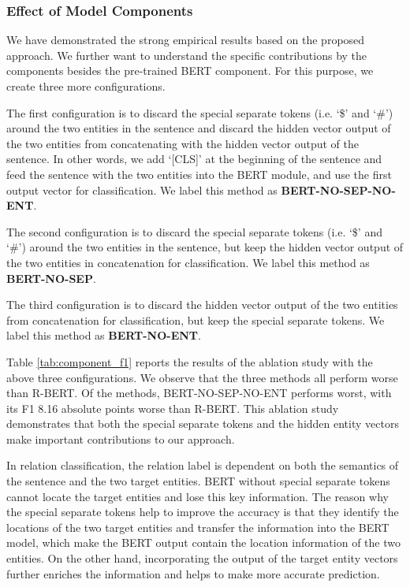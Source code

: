 \documentclass[11pt]{article}
\begin{document}
\subsubsection{Effect of Model Components}

We have demonstrated the strong empirical results
based on the proposed approach. We further want to
understand the specific contributions by the components besides the 
pre-trained BERT component. For this purpose, we create
three more configurations.  

The first configuration is to discard the special separate tokens (i.e. `\$' and `\#') around
the two entities in the sentence and discard the hidden vector output
of the two entities from concatenating with the hidden vector output 
of the sentence. In other words, we add `[CLS]' at the beginning of the sentence and feed the sentence with the two entities into
the BERT module, and use
the first output vector for classification. We label this method as
\textbf{BERT-NO-SEP-NO-ENT}.


The second configuration is to discard the special separate tokens (i.e. `\$' and `\#') around
the two entities in the sentence, but keep the hidden vector output
of the two entities in concatenation for classification. We label this method as
\textbf{BERT-NO-SEP}.

The third configuration is to discard the hidden vector output
of the two entities from concatenation for classification, but keep the special separate tokens. We label this method as
\textbf{BERT-NO-ENT}.

Table \ref{tab:component_f1} reports the results of the ablation study
with the above three configurations. We observe that the three
methods all perform worse than R-BERT. Of the methods,  BERT-NO-SEP-NO-ENT performs worst, with its F1 8.16 absolute points worse
than R-BERT. This ablation study demonstrates that both the special separate
tokens and the hidden entity vectors make important contributions
to our approach.

 In relation classification, the relation label is dependent on 
both the semantics of the sentence and the two target entities. BERT without
special separate tokens cannot locate the target entities and lose this key 
information. 
The reason why the special separate tokens help to improve the
accuracy is that they identify the locations of the two target entities and 
transfer the information into the BERT model, which make the BERT output
contain the location information of the two entities. On the other hand,
incorporating the output of the target entity vectors further enriches the information and helps to make more accurate prediction.  
 
\end{document}
